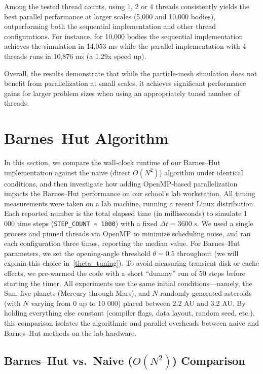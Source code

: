 \documentclass{article}
\begin{document}
Among the tested thread counts, using 1, 2 or 4 threads consistently yields the best parallel performance at larger scales (5,000 and 10,000 bodies), outperforming both the sequential implementation and other thread configurations. 
For instance, for 10,000 bodies the sequential implementation achieves the simulation in 14,053 ms while the parallel implementation with 4 threads runs in 10,876 ms (a 1.29x speed up).

Overall, the results demonstrate that while the particle-mesh simulation does not benefit from parallelization at small scales, it achieves significant performance gains for larger problem sizes when using an appropriately tuned number of threads. 

\section{Barnes–Hut Algorithm}

\noindent
In this section, we compare the wall‐clock runtime of our Barnes–Hut implementation against the naive (direct \(O(N^2)\)) algorithm under identical conditions, and then investigate how adding OpenMP‐based parallelization impacts the Barnes–Hut performance on our school’s lab workstation. All timing measurements were taken on a lab machine, running a recent Linux distribution. Each reported number is the total elapsed time (in milliseconds) to simulate 1 000 time steps (\texttt{STEP\_COUNT = 1000}) with a fixed \(\Delta t = 3600\) s. We used a single process and pinned threads via OpenMP to minimize scheduling noise, and ran each configuration three times, reporting the median value. For Barnes–Hut parameters, we set the opening‐angle threshold \(\theta = 0.5\) throughout (we will explain this choice in~\ref{theta_tuning}). To avoid measuring transient disk or cache effects, we pre‐warmed the code with a short “dummy” run of 50 steps before starting the timer. All experiments use the same initial conditions—namely, the Sun, five planets (Mercury through Mars), and \(N\) randomly generated asteroids (with \(N\) varying from 0 up to 10 000) placed between 2.2 AU and 3.2 AU. By holding everything else constant (compiler flags, data layout, random seed, etc.), this comparison isolates the algorithmic and parallel overheads between naive and Barnes–Hut methods on the lab hardware.


\subsection{Barnes–Hut vs.\ Naive ($O(N^2)$) Comparison}
\end{document}
